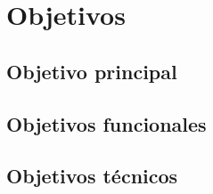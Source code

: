 \chapter{Objetivos}
\label{cap:Objetivo}

\section{Objetivo principal}
\label{sec:ObjetivoP}

\section{Objetivos funcionales}
\label{sec:ObjetivosF}

\section{Objetivos técnicos}
\label{sec:ObjetivosT}